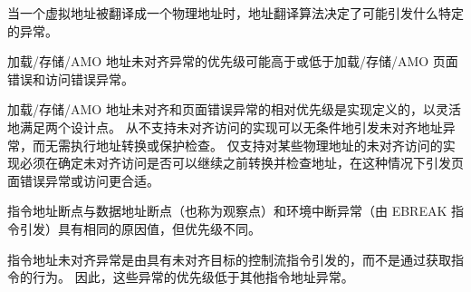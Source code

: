 \iffalse
When a virtual address is translated into
a physical address, the address translation
algorithm determines what specific exception may be raised.

Load/store/AMO address-misaligned exceptions may have
either higher or lower priority than load/store/AMO page-fault and
access-fault exceptions.
\fi
当一个虚拟地址被翻译成一个物理地址时，地址翻译算法决定了可能引发什么特定的异常。

加载/存储/AMO 地址未对齐异常的优先级可能高于或低于加载/存储/AMO 页面错误和访问错误异常。
\iffalse
\begin{commentary}
The relative priority of load/store/AMO address-misaligned and page-fault
exceptions is implementation-defined to flexibly cater to two design points.
Implementations that never support misaligned accesses can unconditionally
raise the misaligned-address exception without performing address translation
or protection checks.
Implementations that support misaligned accesses only to some physical
addresses must translate and check the address before determining whether the
misaligned access may proceed, in which case raising the page-fault exception
or access is more appropriate.
\end{commentary}
\fi
\begin{commentary}
加载/存储/AMO 地址未对齐和页面错误异常的相对优先级是实现定义的，以灵活地满足两个设计点。 从不支持未对齐访问的实现可以无条件地引发未对齐地址异常，而无需执行地址转换或保护检查。 仅支持对某些物理地址的未对齐访问的实现必须在确定未对齐访问是否可以继续之前转换并检查地址，在这种情况下引发页面错误异常或访问更合适。
\end{commentary}
\iffalse
\begin{commentary}
Instruction address breakpoints have the same cause value as, but
different priority than, data address breakpoints (a.k.a. watchpoints)
and environment break exceptions (which are raised by the EBREAK instruction).
\end{commentary}
\fi
\begin{commentary}
指令地址断点与数据地址断点（也称为观察点）和环境中断异常（由 EBREAK 指令引发）具有相同的原因值，但优先级不同。
\end{commentary}

\iffalse
\begin{commentary}
Instruction address misaligned exceptions are raised by control-flow
instructions with misaligned targets, rather than by the act of fetching an
instruction.  Therefore, these exceptions have lower priority than other
instruction address exceptions.
\end{commentary}
\fi
\begin{commentary}
指令地址未对齐异常是由具有未对齐目标的控制流指令引发的，而不是通过获取指令的行为。 因此，这些异常的优先级低于其他指令地址异常。
\end{commentary}

